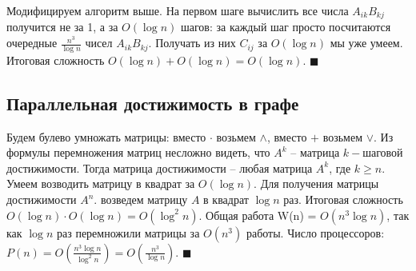  Модифицируем алгоритм выше. На первом шаге вычислить все числа $A_{ik}B_{kj}$ получится не за 1, а за $O(\log n)$ шагов: за каждый шаг просто посчитаются очередные $\frac{n^3}{\log n}$ чисел $A_{ik}B_{kj}$. Получать из них $C_{ij}$ за $O(\log n)$ мы уже умеем. Итоговая сложность $O(\log n) + O(\log n) = O(\log n)$.  $\blacksquare$

\subsection{Параллельная достижимость в графе}

 Будем булево умножать матрицы: вместо $\cdot$ возьмем $\land$, вместо $+$ возьмем $\lor$. Из формулы перемножения матриц несложно видеть, что $A^k$ -- матрица $k-$шаговой достижимости. Тогда матрица достижимости -- любая матрица $A^k$, где $k\geq n$. Умеем возводить матрицу в квадрат за $O(\log n)$. Для получения матрицы достижимости $A^n$. возведем матрицу $A$ в квадрат $\log n$ раз. Итоговая сложность $O(\log n) \cdot O(\log n) = O(\log^2 n)$. Общая работа W(n) = $O(n^3\log n)$, так как $\log n$ раз перемножили матрицы за $O(n^3)$ работы. Число процессоров: $P(n) = O(\frac{n^3\log n}{\log^2 n}) = O(\frac{n^3}{\log n})$. $\blacksquare$
